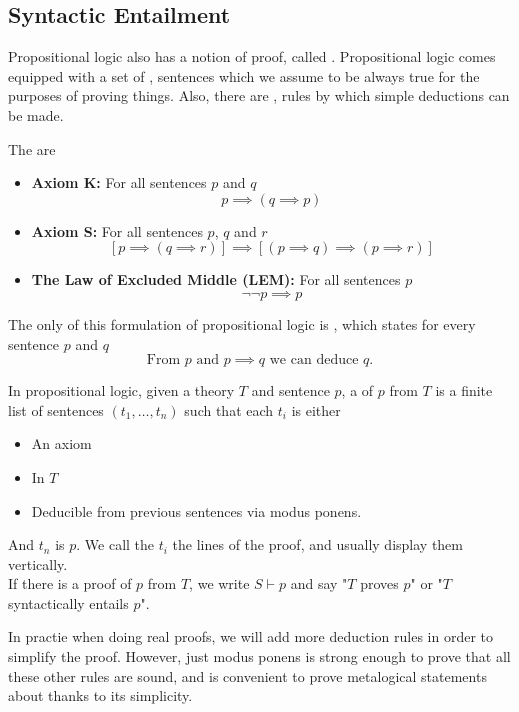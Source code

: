 \documentclass[11pt]{article}
\begin{document}
\subsection{Syntactic Entailment}
Propositional logic also has a notion of proof, called . Propositional logic comes equipped with a set of , sentences which we assume to be always true for the purposes of proving things. Also, there are , rules by which simple deductions can be made.
\begin{defi}
    The  are
    \begin{itemize}
        \item \textbf{Axiom K:} For all sentences $p$ and $q$ \[p \implies (q \implies p)\]
        \item \textbf{Axiom S:} For all sentences $p$, $q$ and $r$ \[[p \implies (q \implies r)] \implies [(p \implies q) \implies (p \implies r)]\]
        \item \textbf{The Law of Excluded Middle (LEM):} For all sentences $p$ \[\neg\neg p \implies p\]
    \end{itemize}
\end{defi}
\begin{defi}
    The only  of this formulation of propositional logic is , which states for every sentence $p$ and $q$
    \[\text{From } p \text{ and } p \implies q \text{ we can deduce } q. \]
\end{defi}
\begin{defi}[Proof]
    In propositional logic, given a theory $T$ and sentence $p$, a  of $p$ from $T$ is a finite  list of sentences $(t_1, \dots, t_n)$ such that each $t_i$ is either
    \begin{itemize}
        \item An axiom
        \item In $T$
        \item Deducible from previous sentences via modus ponens.
    \end{itemize}
    And $t_n$ is $p$. We call the $t_i$ the lines of the proof, and usually display them vertically.
    \\If there is a proof of $p$ from $T$, we write $S \vdash p$ and say "$T$ proves $p$" or "$T$ syntactically entails $p$".
\end{defi}
\begin{sidenote}
    In practie when doing real proofs, we will add more deduction rules in order to simplify the proof. However, just modus ponens is strong enough to prove that all these other rules are sound, and is convenient to prove metalogical statements about thanks to its simplicity.
\end{sidenote}
\pagebreak
\end{document}
